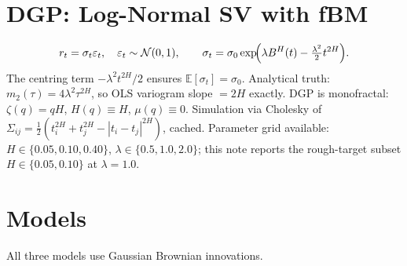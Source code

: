 \documentclass[11pt,a4paper]{article}
\begin{document}
\section{DGP: Log-Normal SV with fBM}
\begin{equation}
  r_t=\sigma_t\varepsilon_t,\quad\varepsilon_t\sim\mathcal{N}(0,1),\qquad
  \sigma_t=\sigma_0\exp\!\Bigl(\lambda B^H(t)-\tfrac{\lambda^2}{2}t^{2H}\Bigr).
\end{equation}
The centring term $-\lambda^2 t^{2H}/2$ ensures $\mathbb{E}[\sigma_t]=\sigma_0$.
Analytical truth: $m_2(\tau)=4\lambda^2\tau^{2H}$, so OLS variogram slope $=2H$ exactly.
DGP is monofractal: $\zeta(q)=qH$, $H(q)\equiv H$, $\mu(q)\equiv0$.
Simulation via Cholesky of $\Sigma_{ij}=\tfrac12(t_i^{2H}+t_j^{2H}-|t_i-t_j|^{2H})$, cached.
Parameter grid available: $H\in\{0.05,0.10,0.40\}$, $\lambda\in\{0.5,1.0,2.0\}$; this
note reports the rough-target subset $H\in\{0.05,0.10\}$ at $\lambda=1.0$.
\section{Models}
All three models use Gaussian Brownian innovations.
\end{document}
